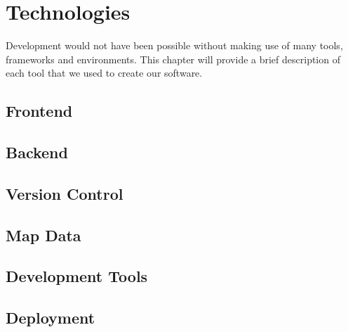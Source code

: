 \section{Technologies}

Development would not have been possible without making use of many tools, frameworks and environments. This chapter will provide a brief description of each tool that we used to create our software. 

%

%

\subsection{Frontend}


\subsection{Backend}


\subsection{Version Control}


\subsection{Map Data}


\subsection{Development Tools}


\subsection{Deployment}


\newpage